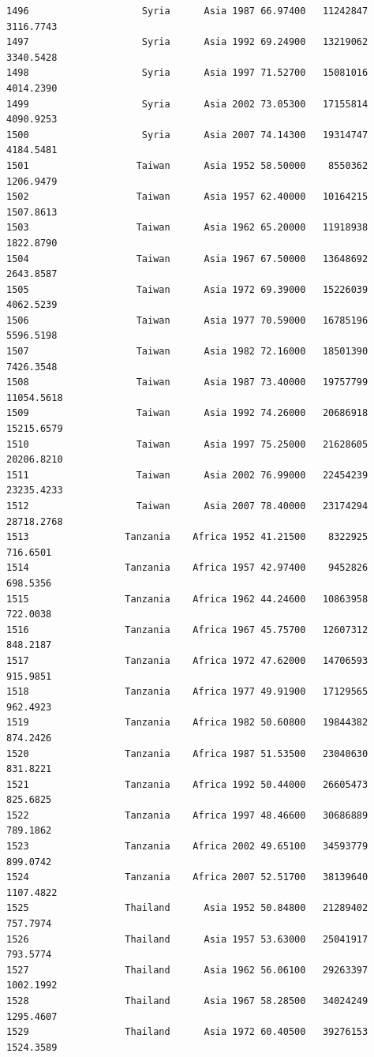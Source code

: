 \documentclass[
  letterpaper,
  DIV=11,
  numbers=noendperiod]{scrreprt}
\begin{document}
\begin{verbatim}
1496                    Syria      Asia 1987 66.97400   11242847   3116.7743
1497                    Syria      Asia 1992 69.24900   13219062   3340.5428
1498                    Syria      Asia 1997 71.52700   15081016   4014.2390
1499                    Syria      Asia 2002 73.05300   17155814   4090.9253
1500                    Syria      Asia 2007 74.14300   19314747   4184.5481
1501                   Taiwan      Asia 1952 58.50000    8550362   1206.9479
1502                   Taiwan      Asia 1957 62.40000   10164215   1507.8613
1503                   Taiwan      Asia 1962 65.20000   11918938   1822.8790
1504                   Taiwan      Asia 1967 67.50000   13648692   2643.8587
1505                   Taiwan      Asia 1972 69.39000   15226039   4062.5239
1506                   Taiwan      Asia 1977 70.59000   16785196   5596.5198
1507                   Taiwan      Asia 1982 72.16000   18501390   7426.3548
1508                   Taiwan      Asia 1987 73.40000   19757799  11054.5618
1509                   Taiwan      Asia 1992 74.26000   20686918  15215.6579
1510                   Taiwan      Asia 1997 75.25000   21628605  20206.8210
1511                   Taiwan      Asia 2002 76.99000   22454239  23235.4233
1512                   Taiwan      Asia 2007 78.40000   23174294  28718.2768
1513                 Tanzania    Africa 1952 41.21500    8322925    716.6501
1514                 Tanzania    Africa 1957 42.97400    9452826    698.5356
1515                 Tanzania    Africa 1962 44.24600   10863958    722.0038
1516                 Tanzania    Africa 1967 45.75700   12607312    848.2187
1517                 Tanzania    Africa 1972 47.62000   14706593    915.9851
1518                 Tanzania    Africa 1977 49.91900   17129565    962.4923
1519                 Tanzania    Africa 1982 50.60800   19844382    874.2426
1520                 Tanzania    Africa 1987 51.53500   23040630    831.8221
1521                 Tanzania    Africa 1992 50.44000   26605473    825.6825
1522                 Tanzania    Africa 1997 48.46600   30686889    789.1862
1523                 Tanzania    Africa 2002 49.65100   34593779    899.0742
1524                 Tanzania    Africa 2007 52.51700   38139640   1107.4822
1525                 Thailand      Asia 1952 50.84800   21289402    757.7974
1526                 Thailand      Asia 1957 53.63000   25041917    793.5774
1527                 Thailand      Asia 1962 56.06100   29263397   1002.1992
1528                 Thailand      Asia 1967 58.28500   34024249   1295.4607
1529                 Thailand      Asia 1972 60.40500   39276153   1524.3589

\end{verbatim}
\end{document}
